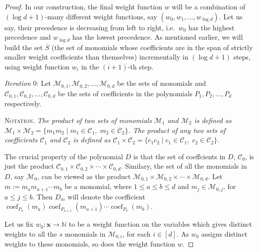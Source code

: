 \documentclass[final,oneeqnum, onethmnum, onefignum]{siamltex1213}
\newcommand{\N}{\mathbb N}
\newcommand{\F}{\mathbb F}
\newcommand{\C}{\mathcal C}
\newcommand{\M}{\mathcal M}
\newcommand{\coeff}{\operatorname{coef}}
\newcommand{\x}{\mathbf{x}}
\renewcommand{\H}{\mathbb H}
\renewcommand{\o}[1]{\overline{#1}}
\newenvironment{notation}{N\textsc{otation}.\em}{}
\begin{document}
\begin{proof}
In our construction, 
the final weight function $w$ will be a combination of $(\log d +1)$-many
different weight functions, say $(w_0, w_1, \dots, w_{\log d})$. 
Let us say,
 their precedence is decreasing from left to right, 
i.e.\ $w_0$ has the highest
precedence and $w_{\log d}$ has the lowest precedence. 
As mentioned earlier, we will build the set $\o{S}$ 
(the set of monomials whose coefficients are 
in the span of strictly smaller weight coefficients than themselves)
 incrementally
in $(\log d +1)$ steps, using weight function $w_i$ in the $(i+1)$-th step. 

{\em Iteration $0$}: Let $\M_{0,1}, \M_{0,2}, \dots, \M_{0,d}$ be 
the sets of monomials and
 $\C_{0,1}, \C_{0,2}, \dots, \C_{0,d}$ be the sets of coefficients in the polynomials 
$P_1, P_2, \dots, P_d$ respectively. 

\begin{notation}
The product of two sets of monomials $\M_1$ and $\M_2$ is defined as
$\M_1 \times \M_2 = \{ m_1 m_2 \mid m_1 \in \C_1, \; m_2 \in \C_2 \} $.
The product of any two sets of coefficients $\C_1$ and $\C_2$ is defined as
$\C_1 \times \C_2 = \{ c_1 c_2 \mid c_1 \in \C_1, \; c_2 \in \C_2 \} $.
\end{notation}

The crucial property of the polynomial $D$ is that the set of coeffcients 
in $D$, $\C_0$, is just the product $\C_{0,1} \times \C_{0,2} \times \dotsm \times \C_{0,d}$.
Similary, the set of all the monomials in $D$, say $\M_0$, can
be viewed as the product $\M_{0,1} \times \M_{0,2} \times \dotsm \times \M_{0,d}$.
Let $m := m_{a} m_{a+1} \dotsm m_{b}$ be a monomial, where $1 \leq a \leq b \leq d$
and $m_{j} \in \M_{0,j}$, for $a \leq j \leq b$.
Then $D_m$ will denote the coefficient 
$ \coeff_{P_a}(m_a) \coeff_{P_{a+1}}(m_{a+1}) \dotsm \coeff_{P_b}(m_b)$.


Let us fix $w_0 \colon \x \to \N$ to be a weight function on the variables
which gives distinct weights to
 all the $s$ monomials in $\M_{0,i}$, for each $i \in [d]$.
As $w_0$ assigns distinct weights to these monomials, 
so does the weight function $w$.


\end{proof}
\end{document}
